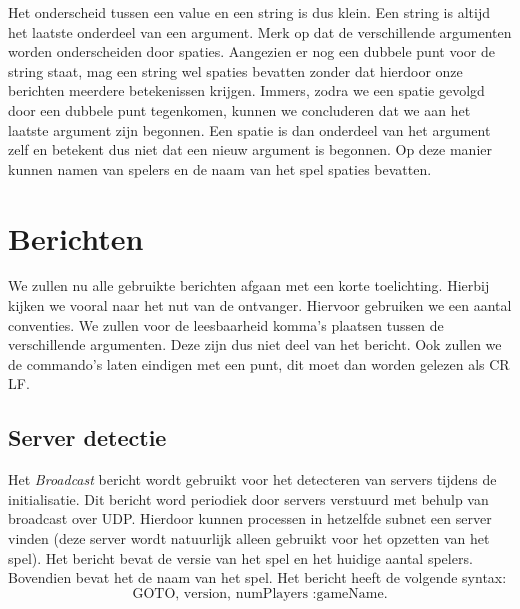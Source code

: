 \documentclass[a4paper,11pt]{article}
\begin{document}
    Het onderscheid tussen een value en een string is dus klein. Een string is altijd het laatste onderdeel van een argument. Merk op dat de verschillende argumenten worden onderscheiden door spaties. Aangezien er nog een dubbele punt voor de string staat, mag een string wel spaties bevatten zonder dat hierdoor onze berichten meerdere betekenissen krijgen. Immers, zodra we een spatie gevolgd door een dubbele punt tegenkomen, kunnen we concluderen dat we aan het laatste argument zijn begonnen. Een spatie is dan onderdeel van het argument zelf en betekent dus niet dat een nieuw argument is begonnen. Op deze manier kunnen namen van spelers en de naam van het spel spaties bevatten.

    \section{Berichten}
    We zullen nu alle gebruikte berichten afgaan met een korte toelichting. Hierbij kijken we vooral naar het nut van de ontvanger. Hiervoor gebruiken we een aantal conventies. We zullen voor de leesbaarheid komma's plaatsen tussen de verschillende argumenten. Deze zijn dus niet deel van het bericht. Ook zullen we de commando's laten eindigen met een punt, dit moet dan worden gelezen als CR LF.

    \subsection{Server detectie}
    Het \emph{Broadcast} bericht wordt gebruikt voor het detecteren van servers tijdens de initialisatie. Dit bericht word periodiek door servers verstuurd met behulp van broadcast over UDP. Hierdoor kunnen processen in hetzelfde subnet een server vinden (deze server wordt natuurlijk alleen gebruikt voor het opzetten van het spel). Het bericht bevat de versie van het spel en het huidige aantal spelers. Bovendien bevat het de naam van het spel. Het bericht heeft de volgende syntax:
    \[
    \text{GOTO, version, numPlayers :gameName.}
    \]
\end{document}
